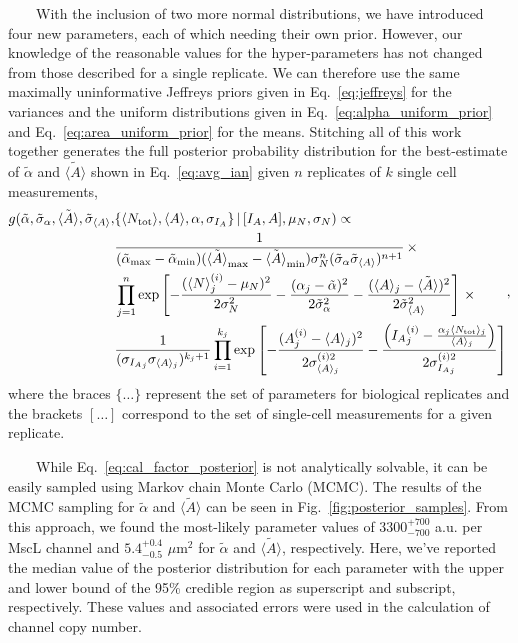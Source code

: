 ~~~~With
the
inclusion
of two
more
normal
distributions,
we
have
introduced
four
new
parameters,
each
of
which
needing
their
own
prior.
However,
our
knowledge
of the
reasonable
values
for
the
hyper-parameters
has
not
changed
from
those
described
for a
single
replicate.
We can
therefore
use
the
same
maximally
uninformative
Jeffreys
priors
given
in
Eq.~\ref{eq:jeffreys}
for
the
variances
and
the
uniform
distributions
given
in
Eq.~\ref{eq:alpha_uniform_prior}
and
Eq.~\ref{eq:area_uniform_prior}
for
the
means.
Stitching
all of
this
work
together
generates
the
full
posterior
probability
distribution
for
the
best-estimate
of
\(\tilde{\alpha}\)
and
\(\tilde{\langle A \rangle}\)
shown
in
Eq.~\ref{eq:avg_ian}
given
\(n\)
replicates
of
\(k\)
single
cell
measurements,
\begin{equation}
\begin{aligned}
g(\tilde{\alpha}, \tilde{\sigma}_\alpha, \tilde{\langle A \rangle}, \tilde{\sigma}_{\langle A \rangle}, &\{\langle N_\text{tot} \rangle, \langle A \rangle, \alpha, \sigma_{I_A}\}\,\vert\, [I_A, A], \mu_N, \sigma_N) \propto\\
&{1 \over (\tilde{\alpha}_\text{max} - \tilde{\alpha}_\text{min})(\tilde{\langle A \rangle}_\text{max} - \tilde{\langle A \rangle}_\text{min})\sigma_N^n(\tilde{\sigma}_\alpha\tilde{\sigma}_{\langle A \rangle})^{n + 1}}\,\times\,\\
&\prod\limits_{j=1}^n\exp\left[-{(\langle N \rangle_j^{(i)} - \mu_N)^2 \over 2\sigma_N^2} - {(\alpha_j - \tilde{\alpha})^2 \over 2\tilde{\sigma}_\alpha^2} - {(\langle A \rangle_j - \tilde{\langle A \rangle})^2 \over 2\tilde{\sigma}_{\langle A \rangle}^2}\right]\,\times\,\\ 
&{1 \over (\sigma_{{I_A}_j}\sigma_{\langle A \rangle_j})^{k_j + 1}}\prod\limits_{i=1}^{k_j}\exp\left[-{(A_j^{(i)} - \langle A \rangle_j)^2 \over 2\sigma^{(i)2}_{\langle A \rangle_j}} - {\left({I_A}_{j}^{(i)} - {\alpha_j \langle N_\text{tot}\rangle_j \over \langle A \rangle_j}\right)\over 2\sigma_{{I_A}_j}^{(i)2}}\right]
\end{aligned},
\label{eq:cal_factor_posterior}\end{equation}
where
the
braces
\(\{\dots\}\)
represent
the
set of
parameters
for
biological
replicates
and
the
brackets
\([\dots]\)
correspond
to the
set of
single-cell
measurements
for a
given
replicate.

~~~~While
Eq.~\ref{eq:cal_factor_posterior}
is not
analytically
solvable,
it can
be
easily
sampled
using
Markov
chain
Monte
Carlo
(MCMC).
The
results
of the
MCMC
sampling
for
\(\tilde{\alpha}\)
and
\(\tilde{\langle A \rangle}\)
can be
seen
in
Fig.~\ref{fig:posterior_samples}.
From
this
approach,
we
found
the
most-likely
parameter
values
of
\(3300^{+700}_{-700}\)
a.u.
per
MscL
channel
and
\(5.4^{+0.4}_{-0.5}\)
\(\mu\)m\(^2\)
for
\(\tilde{\alpha}\)
and
\(\tilde{\langle A \rangle}\),
respectively.
Here,
we've
reported
the
median
value
of the
posterior
distribution
for
each
parameter
with
the
upper
and
lower
bound
of the
95\%
credible
region
as
superscript
and
subscript,
respectively.
These
values
and
associated
errors
were
used
in the
calculation
of
channel
copy
number.

